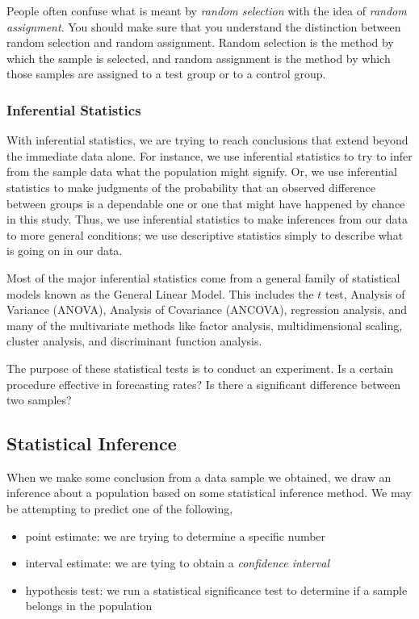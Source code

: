 People often confuse what is meant by \emph{random selection} with the idea of \emph{random assignment}. You should make sure that you understand the distinction between random selection and random assignment. Random selection is the method by which the sample is selected, and random assignment is the method by which those samples are assigned to a test group or to a control group.

\subsubsection{Inferential Statistics}
With inferential statistics, we are trying to reach conclusions that extend beyond the immediate data alone. For instance, we use inferential statistics to try to infer from the sample data what the population might signify. Or, we use inferential statistics to make judgments of the probability that an observed difference between groups is a dependable one or one that might have happened by chance in this study. Thus, we use inferential statistics to make inferences from our data to more general conditions; we use descriptive statistics simply to describe what is going on in our data.
\marginpar{\begin{small}\begin{flushleft}\textcolor{blue}{Inferential statistics help make predictions and judgements}\end{flushleft}\end{small}}

Most of the major inferential statistics come from a general family of statistical models known as the General Linear Model. This includes the $t$ test, Analysis of Variance (ANOVA), Analysis of Covariance (ANCOVA), regression analysis, and many of the multivariate methods like factor analysis, multidimensional scaling, cluster analysis, and discriminant function analysis.

The purpose of these statistical tests is to conduct an experiment. Is a certain procedure effective in forecasting rates? Is there a significant difference between two samples?

\subsection{Statistical Inference}
When we make some conclusion from a data sample we obtained, we draw an inference about a population based on some statistical inference method.
We may be attempting to predict one of the following,
\begin{itemize}
\item point estimate:  we are trying to determine a specific number
\item interval estimate: we are tying to obtain a \emph{confidence interval}
\item hypothesis test:  we run a statistical significance test to determine if a sample belongs in the population
\end{itemize}

